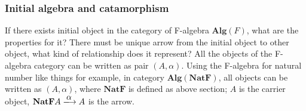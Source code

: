 \documentclass{article}
\begin{document}
\begin{Exercise}
\end{Exercise}

\subsubsection{Initial algebra and catamorphism}

If there exists initial object in the category of F-algebra $\pmb{Alg}(F)$, what are the properties for it? There must be unique arrow from the initial object to other object, what kind of relationship does it represent? All the objects of the F-algebra category can be written as pair $(A, \alpha)$. Using the F-algebra for natural number like things for example, in category $\pmb{Alg}(\mathbf{NatF})$, all objects can be written as $(A, \alpha)$, where $\mathbf{NatF}$ is defined as above section; $A$ is the carrier object, $\mathbf{NatF} A \arrowto{\alpha} A$ is the arrow.



\end{document}
